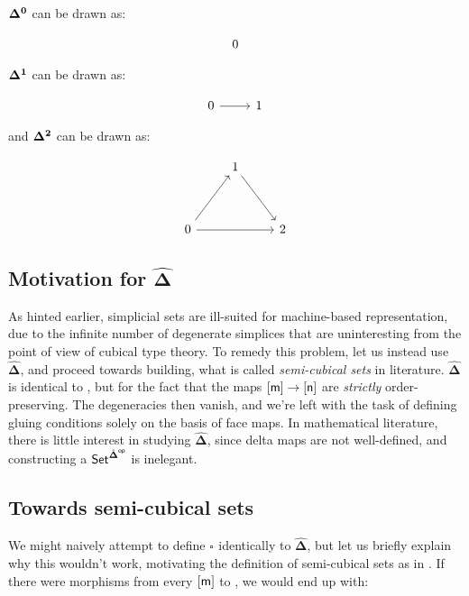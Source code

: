 \documentclass[10pt]{art}
\newcommand{\DeltaHat}{\ensuremath{\hat{\boldsymbol{\Delta}}}}
\newcommand{\Cube}[1]{\ensuremath{\boldsymbol{\square^{#1}}}}
\begin{document}
\begin{example}
  $\boldsymbol{\Delta^{0}}$ can be drawn as:

  $$
    \begin{tikzcd}
      0
    \end{tikzcd}
  $$

  $\boldsymbol{\Delta^{1}}$ can be drawn as:

  $$
    \begin{tikzcd}
      0 \arrow[r] & 1
    \end{tikzcd}
  $$

  and $\boldsymbol{\Delta^{2}}$ can be drawn as:

  $$
    \begin{tikzcd}
      & 1 \arrow[ddr] & \\
      \\
      0 \arrow[uur] \arrow[rr] & & 2
    \end{tikzcd}
  $$
\end{example}

\subsection{Motivation for \texorpdfstring{\DeltaHat}{delta sets}}
As hinted earlier, simplicial sets are ill-suited for machine-based representation, due to the infinite number of degenerate simplices that are uninteresting from the point of view of cubical type theory. To remedy this problem, let us instead use \DeltaHat, and proceed towards building, what is called \emph{semi-cubical sets} in literature. $\DeltaHat$ is identical to \Simplex{}, but for the fact that the maps $\mathsf{[m]} \rightarrow \mathsf{[n]}$ are \emph{strictly} order-preserving. The degeneracies then vanish, and we're left with the task of defining gluing conditions solely on the basis of face maps. In mathematical literature, there is little interest in studying \DeltaHat, since delta maps are not well-defined, and constructing a $\Set^{\op{\DeltaHat}}$ is inelegant.

\subsection{Towards semi-cubical sets}
We might naively attempt to define $\Cube{}$ identically to \DeltaHat, but let us briefly explain why this wouldn't work, motivating the definition of semi-cubical sets as in \cite{Antolini00}. If there were morphisms from every $\mathsf{[m]}$ to , we would end up with:
\end{document}
